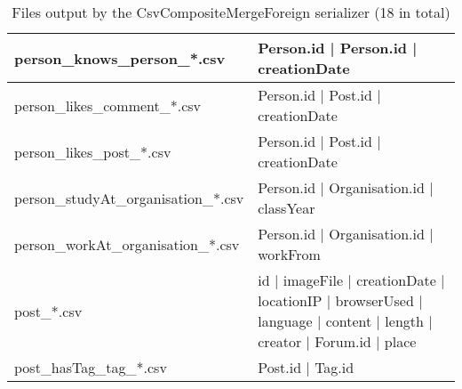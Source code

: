 \begin{table}[htb]
{\begin{tabular}{|p{4.3cm}|p{12.4cm}|}
        person\_knows\_person\_*.csv         & Person.id | Person.id | creationDate                                                                                \\ \hline
        person\_likes\_comment\_*.csv        & Person.id | Post.id | creationDate                                                                                  \\ \hline
        person\_likes\_post\_*.csv           & Person.id | Post.id | creationDate                                                                                  \\ \hline
        person\_studyAt\_organisation\_*.csv & Person.id | Organisation.id | classYear                                                                             \\ \hline
        person\_workAt\_organisation\_*.csv  & Person.id | Organisation.id | workFrom                                                                              \\ \hline
        post\_*.csv                          & id | imageFile | creationDate | locationIP | browserUsed | language | content | length | creator | Forum.id | place \\ \hline
        post\_hasTag\_tag\_*.csv             & Post.id | Tag.id                                                                                                    \\ \hline
    \end{tabular}}
    \caption{Files output by the CsvCompositeMergeForeign serializer (18 in total)}
    \label{table:csv_composite_merge_foreign}
\end{table}
